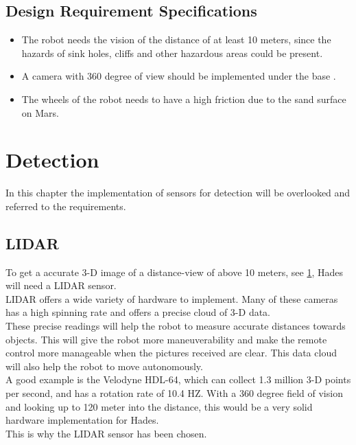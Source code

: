 \section{Design Requirement Specifications} \label{ch:Designrequiremnts}
\begin{itemize}
    \item The robot needs the vision of the distance of at least 10 meters, since the hazards of sink holes, cliffs and other hazardous areas could be present.
    \item A camera with 360 degree of view should be implemented under the base \cite{Lidar360}. %
    \item The wheels of the robot needs to have a high friction due to the sand surface on Mars\cite{sand}.
\end{itemize}

\chapter{Detection} \label{ch:detectionHades}

In this chapter the implementation of sensors for detection will be overlooked and referred to the requirements.

\section{LIDAR}
To get a accurate 3-D image of a distance-view of above 10 meters, see \ref{ch:Designrequiremnts}, Hades will need a LIDAR sensor.\\
LIDAR offers a wide variety of hardware to implement. Many of these cameras has a high spinning rate and offers a precise cloud of 3-D data.\\
These precise readings will help the robot to measure accurate distances towards objects. This will give the robot more maneuverability and make the remote control more manageable when the pictures received are clear. This data cloud will also help the robot to move autonomously.\\
A good example is the Velodyne HDL-64, which can collect 1.3 million 3-D points per second, and has a rotation rate of 10.4 HZ. With a 360 degree field of vision and looking up to 120 meter into the distance, this would be a very solid hardware implementation for Hades. \cite{Lidar360}\\
This is why the LIDAR sensor has been chosen.


